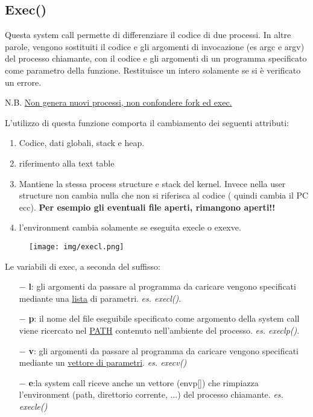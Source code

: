 \documentclass{article}
\begin{document}
\subsection{Exec()}

\noindent{}
\medskip

\noindent Questa system call permette di differenziare il 
codice di due processi. In altre parole, vengono sostituiti
il codice e gli argomenti di invocazione (es argc e argv)
del processo chiamante, con il codice e gli argomenti di un 
programma specificato come parametro della funzione.
Restituisce un intero solamente se si è verificato un errore.

N.B. \underline{Non genera nuovi processi, non confondere fork ed exec.}


L'utilizzo di questa funzione comporta il cambiamento dei 
seguenti attributi:
\begin{enumerate}
    \item Codice, dati globali, stack e heap.
    \item riferimento alla text table
    \item Mantiene la stessa process structure e stack del kernel.
    Invece nella user structure non cambia nulla che non si
    riferisca al codice ( quindi cambia il PC ecc). 
    \textbf{Per esempio gli eventuali file aperti,
    rimangono aperti!!}
    \item l'environment cambia solamente se eseguita execle o exexve.
\end{enumerate}

\begin{figure}[h!]
    \begin{center}
        \texttt{[image: img/execl.png]}
    \end{center}
\end{figure}

\noindent Le variabili di exec, a seconda del suffisso:
\begin{itemize}
    \item[$-$]\textbf{l}: gli argomenti da passare al 
    programma da caricare vengono specificati mediante una 
    \underline{lista} di parametri. \textit{es. execl()}.
    \item[$-$]\textbf{p}: il nome del file eseguibile 
    specificato come argomento della system call viene 
    ricercato nel \underline{PATH} contenuto nell'ambiente 
    del processo. \textit{es. execlp()}.
    \item[$-$]\textbf{v}: gli argomenti da passare al
    programma da caricare vengono specificati mediante 
    un \underline{vettore di parametri}. \textit{es. execv()}
    \item[$-$]\textbf{e}:la system call riceve anche un
    vettore (envp[]) che rimpiazza l'environment (path, 
    direttorio corrente, ...) del processo chiamante. \textit{es.
    execle()}
\end{itemize}
\end{document}

